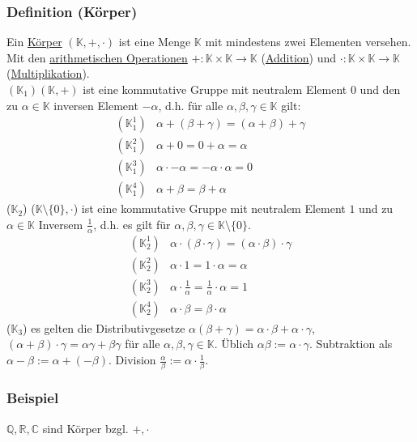 \subsubsection{Definition (Körper)}
Ein \underline{Körper} $(\mathbb{K},+,\cdot )$ ist eine Menge $\mathbb{K}$ mit mindestens zwei Elementen versehen.\\Mit den \underline{arithmetischen Operationen} $+: \mathbb{K}\times\mathbb{K}\rightarrow \mathbb{K}$ (\underline{Addition}) und $\cdot : \mathbb{K}\times\mathbb{K}\rightarrow \mathbb{K}$(\underline{Multiplikation}).\\
$(\mathbb{K}_1) (\mathbb{K},+)$ ist eine kommutative Gruppe mit neutralem Element $0$ und den zu $\alpha\in\mathbb{K}$ inversen Element $-\alpha$, d.h. für alle $\alpha ,\beta ,\gamma\in\mathbb{K}$ gilt:\\
\begin{align*}
(\mathbb{K}_1^1) & \alpha +(\beta + \gamma )= (\alpha + \beta)+\gamma \\
(\mathbb{K}_1^2) & \alpha + 0 = 0 + \alpha = \alpha \\
(\mathbb{K}_1^3) & \alpha \cdot -\alpha = -\alpha \cdot \alpha = 0 \\
(\mathbb{K}_1^4) & \alpha + \beta = \beta + \alpha
\end{align*}
($\mathbb{K}_2$) ($\mathbb{K}\setminus \{0\},\cdot$) ist eine kommutative Gruppe mit neutralem Element $1$ und zu $\alpha\in \mathbb{K}$ Inversem $\frac{1}{\alpha}$, d.h. es gilt für $\alpha ,\beta ,\gamma \in \mathbb{K}\setminus \{0\}$.
\begin{align*}
(\mathbb{K}_2^1) & \alpha \cdot (\beta \cdot \gamma ) = (\alpha \cdot \beta )\cdot \gamma\\
(\mathbb{K}_2^2) & \alpha \cdot 1 = 1\cdot\alpha = \alpha \\
(\mathbb{K}_2^3) & \alpha \cdot \frac{1}{\alpha} = \frac{1}{\alpha}\cdot\alpha = 1 \\
(\mathbb{K}_2^4) & \alpha \cdot \beta = \beta \cdot \alpha
\end{align*}
($\mathbb{K}_3$) es gelten die Distributivgesetze $\alpha (\beta +\gamma )=\alpha \cdot \beta + \alpha \cdot \gamma$, $(\alpha + \beta ) \cdot \gamma = \alpha\gamma + \beta\gamma$ für alle $\alpha ,\beta ,\gamma \in \mathbb{K}$.  Üblich $\alpha\beta :=\alpha \cdot \gamma$.  Subtraktion als $\alpha - \beta := \alpha + (-\beta )$.  Division $\frac{\alpha}{\beta} := \alpha \cdot \frac{1}{\beta}$.
\subsubsection{Beispiel}
$\mathbb{Q},\mathbb{R},\mathbb{C}$ sind Körper bzgl. $+,\cdot$
